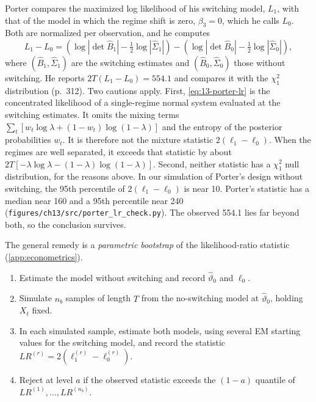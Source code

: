 Porter compares the maximized log likelihood of his switching model, $L_1$, with that of the model in which the
regime shift is zero, $\beta_3 = 0$, which he calls $L_0$. Both are normalized per observation, and he computes
\begin{equation}\label{eq:13-porter-lr}
  L_1 - L_0 = \left(\log|\det \hat B_1| - \tfrac{1}{2}\log|\hat\Sigma_1|\right)
  - \left(\log|\det\hat B_0| - \tfrac{1}{2}\log|\hat\Sigma_0|\right),
\end{equation}
where $(\hat B_1, \hat\Sigma_1)$ are the switching estimates and $(\hat B_0,\hat\Sigma_0)$ those without switching.
He reports $2T(L_1 - L_0) = 554.1$ and compares it with the $\chi^2_1$ distribution (p.~312). Two cautions apply.
First, \eqref{eq:13-porter-lr} is the concentrated likelihood of a single-regime normal system evaluated at the
switching estimates. It omits the mixing terms $\sum_t[w_t\log\lambda + (1-w_t)\log(1-\lambda)]$ and the entropy of
the posterior probabilities $w_t$. It is therefore not the mixture statistic $2(\ell_1 - \ell_0)$. When the regimes
are well separated, it exceeds that statistic by about $2T[-\lambda\log\lambda - (1-\lambda)\log(1-\lambda)]$.
Second, neither statistic has a $\chi^2_1$ null distribution, for the reasons above. In our simulation of Porter's
design without switching, the 95th percentile of $2(\ell_1 - \ell_0)$ is near 10. Porter's statistic has a median
near 160 and a 95th percentile near 240 (\texttt{figures/ch13/src/porter\_lr\_check.py}). The observed
554.1 lies far beyond both, so the conclusion survives.

The general remedy is a \emph{parametric bootstrap} of the likelihood-ratio statistic (\cref{app:econometrics}).
\begin{enumerate}
\item Estimate the model without switching and record $\hat\vartheta_0$ and $\ell_0$.
\item Simulate $n_b$ samples of length $T$ from the no-switching model at $\hat\vartheta_0$, holding $X_t$ fixed.
\item In each simulated sample, estimate both models, using several EM starting values for the switching model,
and record the statistic $LR^{(r)} = 2(\ell_1^{(r)} - \ell_0^{(r)})$.
\item Reject at level $a$ if the observed statistic exceeds the $(1-a)$ quantile of $LR^{(1)}, \dots, LR^{(n_b)}$.
\end{enumerate}

